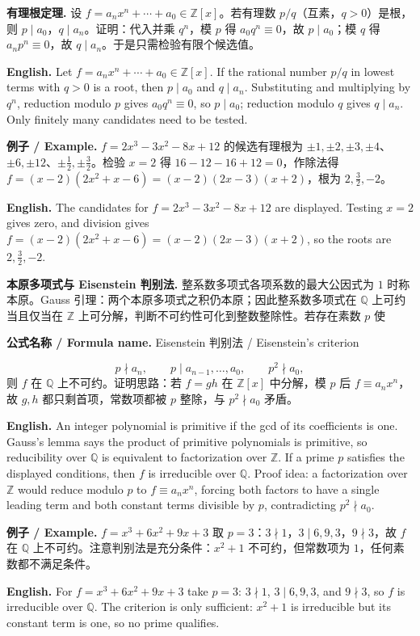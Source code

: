 \documentclass[UTF8,11pt,a4paper]{ctexart}
\newcommand{\EN}[1]{\par\noindent\textbf{English.} #1\par}
\newcommand{\FORMULA}[2]{\par\noindent\textbf{公式名称 / Formula name.} #1 / #2\par}
\newcommand{\EX}[2]{\par\noindent\textbf{例子 / Example.} #1\par\EN{#2}}
\begin{document}
\noindent\textbf{有理根定理.} 设 $f=a_nx^n+\cdots+a_0\in\mathbb Z[x]$。若有理数 $p/q$（互素，$q>0$）是根，则 $p\mid a_0$，$q\mid a_n$。证明：代入并乘 $q^n$，模 $p$ 得 $a_0q^n\equiv0$，故 $p\mid a_0$；模 $q$ 得 $a_np^n\equiv0$，故 $q\mid a_n$。于是只需检验有限个候选值。
\EN{Let $f=a_nx^n+\cdots+a_0\in\mathbb Z[x]$. If the rational number $p/q$ in lowest terms with $q>0$ is a root, then $p\mid a_0$ and $q\mid a_n$. Substituting and multiplying by $q^n$, reduction modulo $p$ gives $a_0q^n\equiv0$, so $p\mid a_0$; reduction modulo $q$ gives $q\mid a_n$. Only finitely many candidates need to be tested.}
\EX{$f=2x^3-3x^2-8x+12$ 的候选有理根为 $\pm1,\pm2,\pm3,\pm4$、$\pm6,\pm12$、$\pm\tfrac12,\pm\tfrac32$。检验 $x=2$ 得 $16-12-16+12=0$，作除法得 $f=(x-2)(2x^2+x-6)=(x-2)(2x-3)(x+2)$，根为 $2,\tfrac32,-2$。}{The candidates for $f=2x^3-3x^2-8x+12$ are displayed. Testing $x=2$ gives zero, and division gives $f=(x-2)(2x^2+x-6)=(x-2)(2x-3)(x+2)$, so the roots are $2,\tfrac32,-2$.}
\noindent\textbf{本原多项式与 Eisenstein 判别法.} 整系数多项式各项系数的最大公因式为 $1$ 时称本原。Gauss 引理：两个本原多项式之积仍本原；因此整系数多项式在 $\mathbb Q$ 上可约当且仅当在 $\mathbb Z$ 上可分解，判断不可约性可化到整数整除性。若存在素数 $p$ 使
\FORMULA{Eisenstein 判别法}{Eisenstein's criterion}
\[
p\nmid a_n,\qquad p\mid a_{n-1},\dots,a_0,\qquad p^2\nmid a_0,
\]
则 $f$ 在 $\mathbb Q$ 上不可约。证明思路：若 $f=gh$ 在 $\mathbb Z[x]$ 中分解，模 $p$ 后 $f\equiv a_nx^n$，故 $g,h$ 都只剩首项，常数项都被 $p$ 整除，与 $p^2\nmid a_0$ 矛盾。
\EN{An integer polynomial is primitive if the gcd of its coefficients is one. Gauss's lemma says the product of primitive polynomials is primitive, so reducibility over $\mathbb Q$ is equivalent to factorization over $\mathbb Z$. If a prime $p$ satisfies the displayed conditions, then $f$ is irreducible over $\mathbb Q$. Proof idea: a factorization over $\mathbb Z$ would reduce modulo $p$ to $f\equiv a_nx^n$, forcing both factors to have a single leading term and both constant terms divisible by $p$, contradicting $p^2\nmid a_0$.}
\EX{$f=x^3+6x^2+9x+3$ 取 $p=3$：$3\nmid1$，$3\mid6,9,3$，$9\nmid3$，故 $f$ 在 $\mathbb Q$ 上不可约。注意判别法是充分条件：$x^2+1$ 不可约，但常数项为 $1$，任何素数都不满足条件。}{For $f=x^3+6x^2+9x+3$ take $p=3$: $3\nmid1$, $3\mid6,9,3$, and $9\nmid3$, so $f$ is irreducible over $\mathbb Q$. The criterion is only sufficient: $x^2+1$ is irreducible but its constant term is one, so no prime qualifies.}
\end{document}
